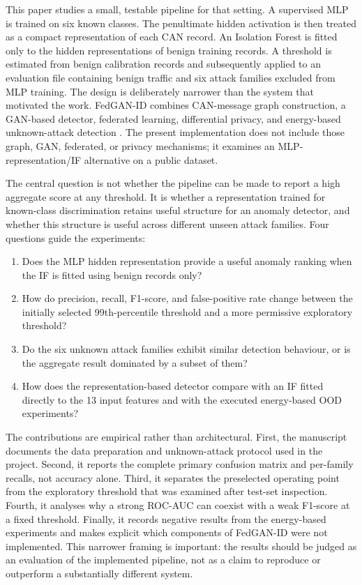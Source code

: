 \documentclass[journal]{IEEEtran}
\begin{document}
This paper studies a small, testable pipeline for that setting. A supervised MLP is trained on six known classes. The penultimate hidden activation is then treated as a compact representation of each CAN record. An Isolation Forest is fitted only to the hidden representations of benign training records. A threshold is estimated from benign calibration records and subsequently applied to an evaluation file containing benign traffic and six attack families excluded from MLP training. The design is deliberately narrower than the system that motivated the work. FedGAN-ID combines CAN-message graph construction, a GAN-based detector, federated learning, differential privacy, and energy-based unknown-attack detection \cite{chen2025fedgan}. The present implementation does not include those graph, GAN, federated, or privacy mechanisms; it examines an MLP-representation/IF alternative on a public dataset.

The central question is not whether the pipeline can be made to report a high aggregate score at any threshold. It is whether a representation trained for known-class discrimination retains useful structure for an anomaly detector, and whether this structure is useful across different unseen attack families. Four questions guide the experiments:
\begin{enumerate}
  \item Does the MLP hidden representation provide a useful anomaly ranking when the IF is fitted using benign records only?
  \item How do precision, recall, F1-score, and false-positive rate change between the initially selected 99th-percentile threshold and a more permissive exploratory threshold?
  \item Do the six unknown attack families exhibit similar detection behaviour, or is the aggregate result dominated by a subset of them?
  \item How does the representation-based detector compare with an IF fitted directly to the 13 input features and with the executed energy-based OOD experiments?
\end{enumerate}

The contributions are empirical rather than architectural. First, the manuscript documents the data preparation and unknown-attack protocol used in the project. Second, it reports the complete primary confusion matrix and per-family recalls, not accuracy alone. Third, it separates the preselected operating point from the exploratory threshold that was examined after test-set inspection. Fourth, it analyses why a strong ROC-AUC can coexist with a weak F1-score at a fixed threshold. Finally, it records negative results from the energy-based experiments and makes explicit which components of FedGAN-ID were not implemented. This narrower framing is important: the results should be judged as an evaluation of the implemented pipeline, not as a claim to reproduce or outperform a substantially different system.
\end{document}
